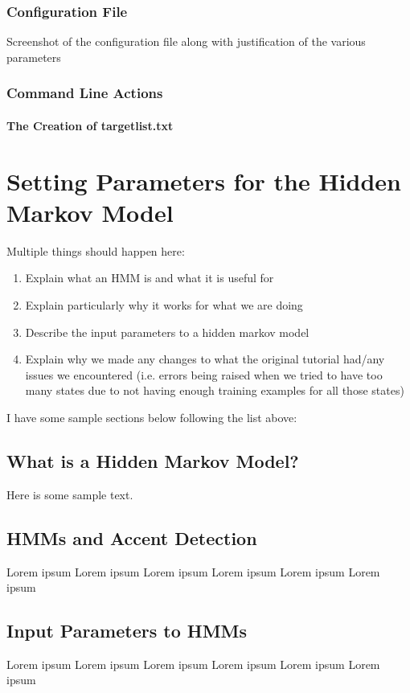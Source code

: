 \documentclass{wileySev}
\begin{document}
\subsection{Configuration File}
Screenshot of the configuration file along with justification of the various parameters

\subsection{Command Line Actions}

\subsubsection{The Creation of targetlist.txt}


\chapter{Setting Parameters for the Hidden Markov Model}
Multiple things should happen here:
\begin{enumerate}
\item Explain what an HMM is and what it is useful for
\item Explain particularly why it works for what we are doing
\item Describe the input parameters to a hidden markov model
\item Explain why we made any changes to what the original tutorial had/any issues we encountered (i.e. errors being raised when we tried to have too many states due to not having enough training examples for all those states)
\end{enumerate}

I have some sample sections below following the list above:

\section{What is a Hidden Markov Model?}
Here is some sample text.

\section{HMMs and Accent Detection}
Lorem ipsum Lorem ipsum Lorem ipsum Lorem ipsum Lorem ipsum Lorem ipsum

\section{Input Parameters to HMMs} 
Lorem ipsum Lorem ipsum Lorem ipsum Lorem ipsum Lorem ipsum Lorem ipsum
\end{document}
